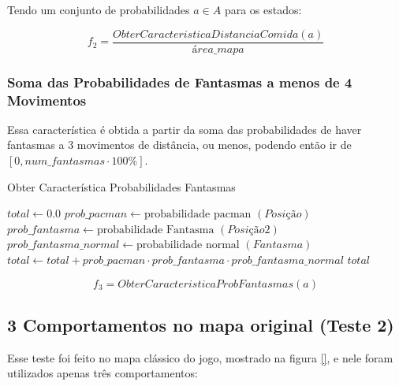 Tendo um conjunto de probabilidades $ a \in A $ para os estados:

$$ f_2 = \frac{ObterCaracteristicaDistanciaComida \left( a \right)}{\textit{área\_mapa}} $$

\subsubsection*{Soma das Probabilidades de Fantasmas a menos de 4 Movimentos}

Essa característica é obtida a partir da soma das probabilidades de haver fantasmas a 3 movimentos de distância, ou menos, podendo então ir de $ \left[ 0, num\_fantasmas \cdot 100\% \right] $.

\begin{algorithm}[H]
	\caption{Obter Característica Probabilidades Fantasmas} \label{algorithm:ObterCaracteristicaProbabilidadesFantasmas}
	\begin{algorithmic}[1]
			\State $\textit{total} \gets 0.0 $
						\State $\textit{prob\_pacman} \gets \text{probabilidade pacman } \left( \textit{Posição} \right) $
							\State $\textit{prob\_fantasma} \gets \text{probabilidade Fantasma } \left( \textit{Posição2} \right) $
							\State $\textit{prob\_fantasma\_normal} \gets \text{probabilidade normal } \left( \textit{Fantasma} \right) $
							\State $\textit{total} \gets \textit{total} + \textit{prob\_pacman}  \cdot \textit{prob\_fantasma} \cdot \textit{prob\_fantasma\_normal} $
						\EndFor
					\EndIf
				\EndFor
			\EndFor
			\State \Return $ \textit{total} $
		\EndProcedure
	\end{algorithmic}
\end{algorithm}

$$ f_3 = ObterCaracteristicaProbFantasmas \left( a \right) $$


\subsection{3 Comportamentos no mapa original (Teste 2)} \label{subsection:3ComportamentosMapaOriginal}

Esse teste foi feito no mapa clássico do jogo, mostrado na figura \ref{}, e nele foram utilizados apenas três comportamentos:

